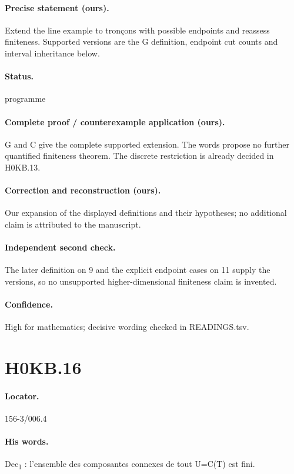 \paragraph{Precise statement (ours).} Extend the line example to tronçons with possible endpoints and reassess finiteness. Supported versions are the G definition, endpoint cut counts and interval inheritance below.

\paragraph{Status.} programme

\paragraph{Complete proof / counterexample application (ours).} G and C give the complete supported extension. The words propose no further quantified finiteness theorem. The discrete restriction is already decided in H0KB.13.

\paragraph{Correction and reconstruction (ours).} Our expansion of the displayed definitions and their hypotheses; no additional claim is attributed to the manuscript.

\paragraph{Independent second check.} The later definition on 9 and the explicit endpoint cases on 11 supply the versions, so no unsupported higher-dimensional finiteness claim is invented.

\paragraph{Confidence.} High for mathematics; decisive wording checked in READINGS.tsv.

\section*{H0KB.16}\label{statement:H0KB.16}
\paragraph{Locator.} 156-3/006.4

\paragraph{His words.} Dec\textsubscript{1} : l’ensemble des composantes connexes de tout U=C(T) est fini.

